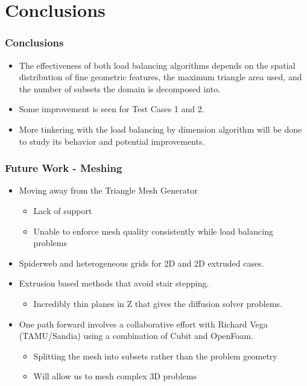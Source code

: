 \documentclass[compress]{beamer}
\begin{document}
\section{Conclusions}
\begin{frame}[t]\frametitle{Conclusions}
\begin{block}{}
\begin{itemize}
\item The effectiveness of both load balancing algorithms depends on the spatial distribution of fine geometric features, the maximum triangle area used, and the number of subsets the domain is decomposed into.
\item Some improvement is seen for Test Cases 1 and 2.
\item More tinkering with the load balancing by dimension algorithm will be done to study its behavior and potential improvements.
\end{itemize}
\end{block}
\end{frame}

\begin{frame}[t]\frametitle{Future Work - Meshing}
\begin{block}{}
\begin{itemize}
\item Moving away from the Triangle Mesh Generator
	\begin{itemize}
		\item Lack of support
		\item Unable to enforce mesh quality consistently while load balancing problems
	\end{itemize}
\item Spiderweb and heterogeneous grids for 2D and 2D extruded cases.
\item Extrusion based methods that avoid stair stepping.
	\begin{itemize}
		\item Incredibly thin planes in Z that gives the diffusion solver problems.
	\end{itemize}
\item One path forward involves a collaborative effort with Richard Vega (TAMU/Sandia) using a combination of Cubit and OpenFoam.
	\begin{itemize}
		\item Splitting the mesh into subsets rather than the problem geometry
		\item Will allow us to mesh complex 3D problems
	\end{itemize}
\end{itemize}
\end{block}
\end{frame}
\end{document}
